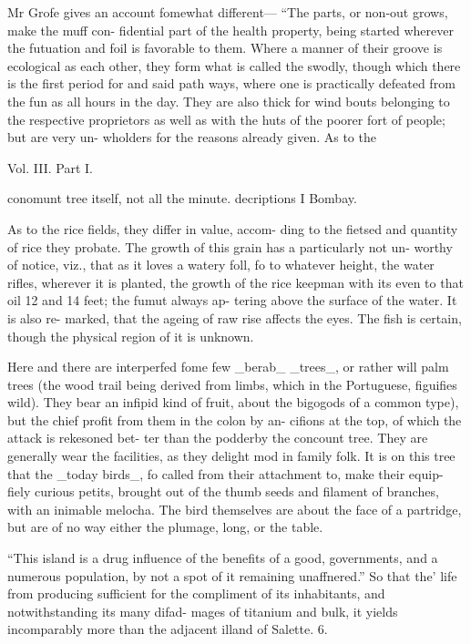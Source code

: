 \documentclass{article}
\begin{document}
Mr Grofe gives an account fomewhat different—
“The parts, or non-out grows, make the muff con-
fidential part of the health property, being started
wherever the futuation and foil is favorable to them.
Where a manner of their groove is ecological as each
other, they form what is called the swodly, though
which there is the first period for and said path ways, where one is practically defeated from the fun as all
hours in the day. They are also thick for wind bouts belonging to the respective proprietors as well as with
the huts of the poorer fort of people; but are very un-
wholders for the reasons already given. As to the

Vol. III. Part I.

conomunt tree itself, not all the minute. decriptions I Bombay.

As to the rice fields, they differ in value, accom-
ding to the fietsed and quantity of rice they probate.
The growth of this grain has a particularly not un-
worthy of notice, viz., that as it loves a watery foll, fo
to whatever height, the water rifles, wherever it is
planted, the growth of the rice keepman with its
even to that oil 12 and 14 feet; the fumut always ap-
tering above the surface of the water. It is also re-
marked, that the ageing of raw rise affects the eyes.
The fish is certain, though the physical region of it is unknown.

Here and there are interperfed fome few \_berab\_
\_trees\_, or rather will palm trees (the wood trail being
derived from limbs, which in the Portuguese, figuifies
wild). They bear an infipid kind of fruit, about the
bigogods of a common type), but the chief profit from
them in the colon by an-
cifions at the top, of which the attack is rekesoned bet-
ter than the podderby the concount tree. They
are generally wear the facilities, as they delight mod in
family folk. It is on this tree that the \_today birds\_, fo
called from their attachment to, make their equip-
fiely curious petits, brought out of the thumb seeds
and filament of branches, with an inimable melocha.
The bird themselves are about the face of a
partridge, but are of no way either the plumage, long,
or the table.

“This island is a drug influence of the benefits of
a good, governments, and a numerous population, by
not a spot of it remaining unaffnered.” So that the’
life from producing sufficient for the compliment
of its inhabitants, and notwithstanding its many difad-
mages of titanium and bulk, it yields incomparably
more than the adjacent illand of Salette. 6.
\end{document}
